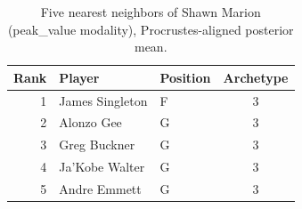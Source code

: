 \begin{table}[htbp]
  \centering\small
  \begin{tabular}{rllc}
    \toprule
    Rank & Player & Position & Archetype \\
    \midrule
    1 & James Singleton & F & 3 \\
    2 & Alonzo Gee & G & 3 \\
    3 & Greg Buckner & G & 3 \\
    4 & Ja'Kobe Walter & G & 3 \\
    5 & Andre Emmett & G & 3 \\
    \bottomrule
  \end{tabular}
  \caption{Five nearest neighbors of Shawn Marion (peak_value modality), Procrustes-aligned posterior mean.}
  \label{tab:Shawn_Marion_neighbors_peak_value}
\end{table}

